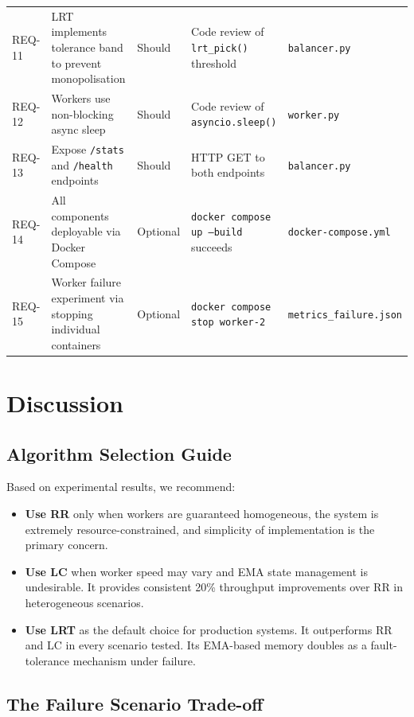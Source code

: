 \documentclass[conference]{IEEEtran}
\begin{document}
\begin{table}[t]
\begin{tabular}{p{0.8cm}p{5.5cm}p{1.5cm}p{3.5cm}p{3.5cm}}
    REQ-11 & LRT implements tolerance band to prevent monopolisation & Should & Code review of \texttt{lrt\_pick()} threshold & \texttt{balancer.py} \\
    REQ-12 & Workers use non-blocking async sleep & Should & Code review of \texttt{asyncio.sleep()} & \texttt{worker.py} \\
    REQ-13 & Expose \texttt{/stats} and \texttt{/health} endpoints & Should & HTTP GET to both endpoints & \texttt{balancer.py} \\
    REQ-14 & All components deployable via Docker Compose & Optional & \texttt{docker compose up --build} succeeds & \texttt{docker-compose.yml} \\
    REQ-15 & Worker failure experiment via stopping individual containers & Optional & \texttt{docker compose stop worker-2} & \texttt{metrics\_failure.json} \\
    \bottomrule
  \end{tabular}
\end{table}

\section{Discussion}

\subsection{Algorithm Selection Guide}

Based on experimental results, we recommend:

\begin{itemize}
  \item \textbf{Use RR} only when workers are guaranteed homogeneous, the system is extremely resource-constrained, and simplicity of implementation is the primary concern.
  \item \textbf{Use LC} when worker speed may vary and EMA state management is undesirable. It provides consistent 20\% throughput improvements over RR in heterogeneous scenarios.
  \item \textbf{Use LRT} as the default choice for production systems. It outperforms RR and LC in every scenario tested. Its EMA-based memory doubles as a fault-tolerance mechanism under failure.
\end{itemize}

\subsection{The Failure Scenario Trade-off}
\end{document}
